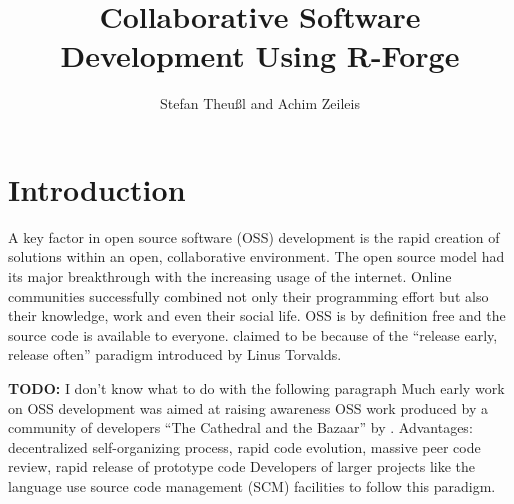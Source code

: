 \title{Collaborative Software Development Using R-Forge}
\author{Stefan Theu\ss{}l and Achim Zeileis}

\maketitle




\section*{Introduction}


A key factor in open source software (OSS) development is the rapid creation
of solutions within an open, collaborative environment. The open
source model had its major breakthrough with the increasing
usage of the internet. Online communities successfully combined
not only their programming effort but also their knowledge, work
and even their social life. OSS is by definition free and
the source code is available to everyone.
claimed to be  because of the
``release early, release often'' paradigm introduced by Linus
Torvalds.


\textbf{TODO: } I don't know what to do with the following paragraph
Much early work on OSS development was aimed at raising awareness  OSS
work produced by a community of developers ``The Cathedral and the
Bazaar'' by \cite{forge:Raymond:1999}.
Advantages:
decentralized self-organizing process, rapid code evolution, massive
peer code review, rapid release of prototype code
Developers of larger projects like the language \R{} use source code
management (SCM) facilities to follow this paradigm.

